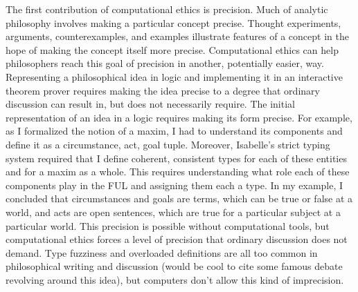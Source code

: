 \begin{isabellebody}
\begin{isamarkuptext}
The first contribution of computational ethics is precision. Much of analytic philosophy involves 
making a particular concept precise. Thought experiments, arguments, counterexamples, and examples 
illustrate features of a concept in the hope of making the concept itself more precise. Computational 
ethics can help philosophers reach this goal of precision in another, potentially easier, way. 
Representing a philosophical idea in logic and implementing it in an interactive theorem prover requires 
making the idea precise to a degree that ordinary discussion can result in, but does not necessarily require. The initial representation 
of an idea in a logic requires making its form precise. For example, 
as I formalized the notion of a maxim, I had to understand its components and define it as a 
circumstance, act, goal tuple. Moreover, Isabelle's strict typing system required that I define 
coherent, consistent types for each of these entities and for a maxim as a whole. This requires understanding 
what role each of these components play in the FUL and assigning them each a type. In my example, I 
concluded that circumstances and goals are terms, which can be true or false at a world, and acts are 
open sentences, which are true for a particular subject at a particular world. This precision is possible 
without computational tools, but computational ethics forces a level of precision that ordinary discussion 
does not demand. Type fuzziness and overloaded definitions are all too common in philosophical writing and 
discussion (would be cool to cite some famous debate revolving around this idea), but computers don't 
allow this kind of imprecision.


\end{isamarkuptext}
\end{isabellebody}
